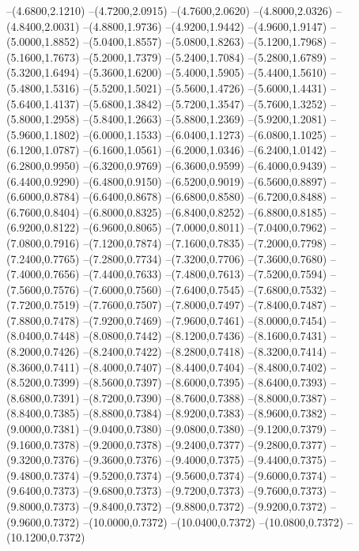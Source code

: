 {	--(4.6800,2.1210)
	--(4.7200,2.0915)
	--(4.7600,2.0620)
	--(4.8000,2.0326)
	--(4.8400,2.0031)
	--(4.8800,1.9736)
	--(4.9200,1.9442)
	--(4.9600,1.9147)
	--(5.0000,1.8852)
	--(5.0400,1.8557)
	--(5.0800,1.8263)
	--(5.1200,1.7968)
	--(5.1600,1.7673)
	--(5.2000,1.7379)
	--(5.2400,1.7084)
	--(5.2800,1.6789)
	--(5.3200,1.6494)
	--(5.3600,1.6200)
	--(5.4000,1.5905)
	--(5.4400,1.5610)
	--(5.4800,1.5316)
	--(5.5200,1.5021)
	--(5.5600,1.4726)
	--(5.6000,1.4431)
	--(5.6400,1.4137)
	--(5.6800,1.3842)
	--(5.7200,1.3547)
	--(5.7600,1.3252)
	--(5.8000,1.2958)
	--(5.8400,1.2663)
	--(5.8800,1.2369)
	--(5.9200,1.2081)
	--(5.9600,1.1802)
	--(6.0000,1.1533)
	--(6.0400,1.1273)
	--(6.0800,1.1025)
	--(6.1200,1.0787)
	--(6.1600,1.0561)
	--(6.2000,1.0346)
	--(6.2400,1.0142)
	--(6.2800,0.9950)
	--(6.3200,0.9769)
	--(6.3600,0.9599)
	--(6.4000,0.9439)
	--(6.4400,0.9290)
	--(6.4800,0.9150)
	--(6.5200,0.9019)
	--(6.5600,0.8897)
	--(6.6000,0.8784)
	--(6.6400,0.8678)
	--(6.6800,0.8580)
	--(6.7200,0.8488)
	--(6.7600,0.8404)
	--(6.8000,0.8325)
	--(6.8400,0.8252)
	--(6.8800,0.8185)
	--(6.9200,0.8122)
	--(6.9600,0.8065)
	--(7.0000,0.8011)
	--(7.0400,0.7962)
	--(7.0800,0.7916)
	--(7.1200,0.7874)
	--(7.1600,0.7835)
	--(7.2000,0.7798)
	--(7.2400,0.7765)
	--(7.2800,0.7734)
	--(7.3200,0.7706)
	--(7.3600,0.7680)
	--(7.4000,0.7656)
	--(7.4400,0.7633)
	--(7.4800,0.7613)
	--(7.5200,0.7594)
	--(7.5600,0.7576)
	--(7.6000,0.7560)
	--(7.6400,0.7545)
	--(7.6800,0.7532)
	--(7.7200,0.7519)
	--(7.7600,0.7507)
	--(7.8000,0.7497)
	--(7.8400,0.7487)
	--(7.8800,0.7478)
	--(7.9200,0.7469)
	--(7.9600,0.7461)
	--(8.0000,0.7454)
	--(8.0400,0.7448)
	--(8.0800,0.7442)
	--(8.1200,0.7436)
	--(8.1600,0.7431)
	--(8.2000,0.7426)
	--(8.2400,0.7422)
	--(8.2800,0.7418)
	--(8.3200,0.7414)
	--(8.3600,0.7411)
	--(8.4000,0.7407)
	--(8.4400,0.7404)
	--(8.4800,0.7402)
	--(8.5200,0.7399)
	--(8.5600,0.7397)
	--(8.6000,0.7395)
	--(8.6400,0.7393)
	--(8.6800,0.7391)
	--(8.7200,0.7390)
	--(8.7600,0.7388)
	--(8.8000,0.7387)
	--(8.8400,0.7385)
	--(8.8800,0.7384)
	--(8.9200,0.7383)
	--(8.9600,0.7382)
	--(9.0000,0.7381)
	--(9.0400,0.7380)
	--(9.0800,0.7380)
	--(9.1200,0.7379)
	--(9.1600,0.7378)
	--(9.2000,0.7378)
	--(9.2400,0.7377)
	--(9.2800,0.7377)
	--(9.3200,0.7376)
	--(9.3600,0.7376)
	--(9.4000,0.7375)
	--(9.4400,0.7375)
	--(9.4800,0.7374)
	--(9.5200,0.7374)
	--(9.5600,0.7374)
	--(9.6000,0.7374)
	--(9.6400,0.7373)
	--(9.6800,0.7373)
	--(9.7200,0.7373)
	--(9.7600,0.7373)
	--(9.8000,0.7373)
	--(9.8400,0.7372)
	--(9.8800,0.7372)
	--(9.9200,0.7372)
	--(9.9600,0.7372)
	--(10.0000,0.7372)
	--(10.0400,0.7372)
	--(10.0800,0.7372)
	--(10.1200,0.7372)
}

